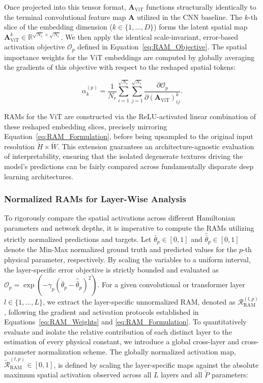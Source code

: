 \documentclass[final,5p,times,twocolumn]{elsarticle}
\begin{document}
Once projected into this tensor format, $\mathbf{A}_{\text{ViT}}$ functions structurally identically to the terminal convolutional feature map $\mathbf{A}$ utilized in the CNN baseline. The $k$-th slice of the embedding dimension ($k \in \{1, \dots, D\}$) forms the latent spatial map $\mathbf{A}_{\text{ViT}}^k \in \mathbb{R}^{\sqrt{N_r} \times \sqrt{N_r}}$. We then apply the identical scale-invariant, error-based activation objective $\mathcal{O}_p$ defined in Equation~\ref{eq:RAM_Objective}. The spatial importance weights for the ViT embeddings are computed by globally averaging the gradients of this objective with respect to the reshaped spatial tokens:

\begin{equation}\label{eq:ViT_Weights}
\alpha_k^{(p)} = \frac{1}{N_r} \sum_{i=1}^{\sqrt{N_r}} \sum_{j=1}^{\sqrt{N_r}} \frac{\partial \mathcal{O}_p}{\partial (\mathbf{A}_{\text{ViT}})_{ij}^k}.
\end{equation}

RAMs for the ViT are constructed via the ReLU-activated linear combination of these reshaped embedding slices, precisely mirroring Equation~\ref{eq:RAM_Formulation}, before being upsampled to the original input resolution $\breve{H} \times \breve{W}$. This extension guarantees an architecture-agnostic evaluation of interpretability, ensuring that the isolated degenerate textures driving the model's predictions can be fairly compared across fundamentally disparate deep learning architectures.

\subsubsection{Normalized RAMs for Layer-Wise Analysis}\label{sec:Nor_RAMs}

To rigorously compare the spatial activations across different Hamiltonian parameters and network depths, it is imperative to compute the RAMs utilizing strictly normalized predictions and targets. Let $\bar{\theta}_p \in [0,1]$ and $\hat{\bar{\theta}}_p \in [0,1]$ denote the Min-Max normalized ground truth and predicted values for the $p$-th physical parameter, respectively. By scaling the variables to a uniform interval, the layer-specific error objective is strictly bounded and evaluated as $\mathcal{O}_p = \exp(-\gamma_p (\bar{\theta}_p - \hat{\bar{\theta}}_p)^2)$. For a given convolutional or transformer layer $l \in \{1, \dots, L\}$, we extract the layer-specific unnormalized RAM, denoted as $\mathcal{R}_{\text{RAM}}^{(l,p)}$, following the gradient and activation protocols established in Equations~\ref{eq:RAM_Weights} and \ref{eq:RAM_Formulation}. To quantitatively evaluate and isolate the relative contribution of each distinct layer to the estimation of every physical constant, we introduce a global cross-layer and cross-parameter normalization scheme. The globally normalized activation map, $\tilde{\mathcal{R}}_{\text{RAM}}^{(l,p)}\in[0,1]$, is defined by scaling the layer-specific maps against the absolute maximum spatial activation observed across all $L$ layers and all $\breve{P}$ parameters:
\end{document}
